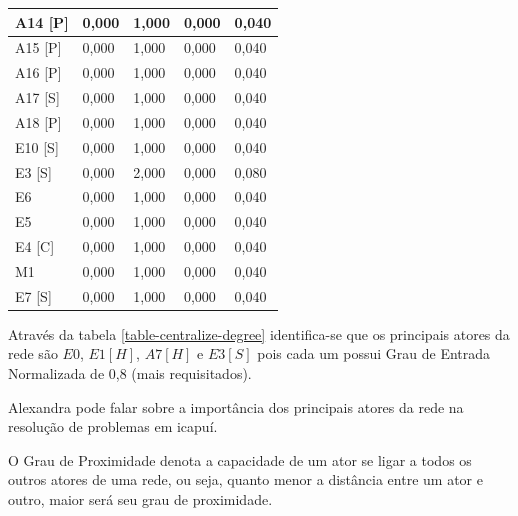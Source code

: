 \begin{table}[htbp]
\begin{tabular}{|l|l|l|l|l|}
A14 {[}P{]}   & 0,000         & 1,000           & 0,000                     & 0,040                       \\ \hline
A15 {[}P{]}   & 0,000         & 1,000           & 0,000                     & 0,040                       \\ \hline
A16 {[}P{]}   & 0,000         & 1,000           & 0,000                     & 0,040                       \\ \hline
A17 {[}S{]}   & 0,000         & 1,000           & 0,000                     & 0,040                       \\ \hline
A18 {[}P{]}   & 0,000         & 1,000           & 0,000                     & 0,040                       \\ \hline
E10 {[}S{]}   & 0,000         & 1,000           & 0,000                     & 0,040                       \\ \hline
E3 {[}S{]}    & 0,000         & 2,000           & 0,000                     & 0,080                       \\ \hline
E6            & 0,000         & 1,000           & 0,000                     & 0,040                       \\ \hline
E5            & 0,000         & 1,000           & 0,000                     & 0,040                       \\ \hline
E4 {[}C{]}    & 0,000         & 1,000           & 0,000                     & 0,040                       \\ \hline
M1            & 0,000         & 1,000           & 0,000                     & 0,040                       \\ \hline
E7 {[}S{]}    & 0,000         & 1,000           & 0,000                     & 0,040                       \\ \hline
\end{tabular}
\end{table}

Através da tabela \ref{table-centralize-degree} identifica-se que os principais atores da rede são $E0$, $E1[H]$, $A7 [H]$ e  $E3[S]$ pois cada um possui Grau de Entrada Normalizada de 0,8 (mais requisitados).

Alexandra pode falar sobre a importância dos principais atores da rede na resolução de problemas em icapuí.

O Grau de Proximidade denota a capacidade de um ator se ligar a todos os outros atores de uma rede, ou seja, quanto menor a distância entre um ator e outro, maior será seu grau de proximidade. 

